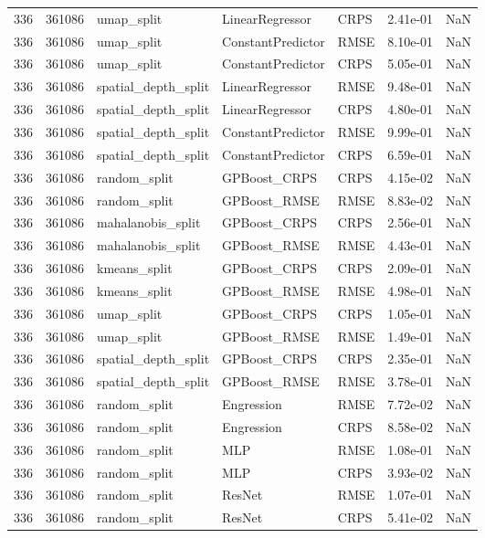 \begin{tabular}{rrlllrr}
336 & 361086 & umap\_split & LinearRegressor & CRPS & 2.41e-01 & NaN \\
336 & 361086 & umap\_split & ConstantPredictor & RMSE & 8.10e-01 & NaN \\
336 & 361086 & umap\_split & ConstantPredictor & CRPS & 5.05e-01 & NaN \\
336 & 361086 & spatial\_depth\_split & LinearRegressor & RMSE & 9.48e-01 & NaN \\
336 & 361086 & spatial\_depth\_split & LinearRegressor & CRPS & 4.80e-01 & NaN \\
336 & 361086 & spatial\_depth\_split & ConstantPredictor & RMSE & 9.99e-01 & NaN \\
336 & 361086 & spatial\_depth\_split & ConstantPredictor & CRPS & 6.59e-01 & NaN \\
336 & 361086 & random\_split & GPBoost\_CRPS & CRPS & 4.15e-02 & NaN \\
336 & 361086 & random\_split & GPBoost\_RMSE & RMSE & 8.83e-02 & NaN \\
336 & 361086 & mahalanobis\_split & GPBoost\_CRPS & CRPS & 2.56e-01 & NaN \\
336 & 361086 & mahalanobis\_split & GPBoost\_RMSE & RMSE & 4.43e-01 & NaN \\
336 & 361086 & kmeans\_split & GPBoost\_CRPS & CRPS & 2.09e-01 & NaN \\
336 & 361086 & kmeans\_split & GPBoost\_RMSE & RMSE & 4.98e-01 & NaN \\
336 & 361086 & umap\_split & GPBoost\_CRPS & CRPS & 1.05e-01 & NaN \\
336 & 361086 & umap\_split & GPBoost\_RMSE & RMSE & 1.49e-01 & NaN \\
336 & 361086 & spatial\_depth\_split & GPBoost\_CRPS & CRPS & 2.35e-01 & NaN \\
336 & 361086 & spatial\_depth\_split & GPBoost\_RMSE & RMSE & 3.78e-01 & NaN \\
336 & 361086 & random\_split & Engression & RMSE & 7.72e-02 & NaN \\
336 & 361086 & random\_split & Engression & CRPS & 8.58e-02 & NaN \\
336 & 361086 & random\_split & MLP & RMSE & 1.08e-01 & NaN \\
336 & 361086 & random\_split & MLP & CRPS & 3.93e-02 & NaN \\
336 & 361086 & random\_split & ResNet & RMSE & 1.07e-01 & NaN \\
336 & 361086 & random\_split & ResNet & CRPS & 5.41e-02 & NaN \\

\end{tabular}
